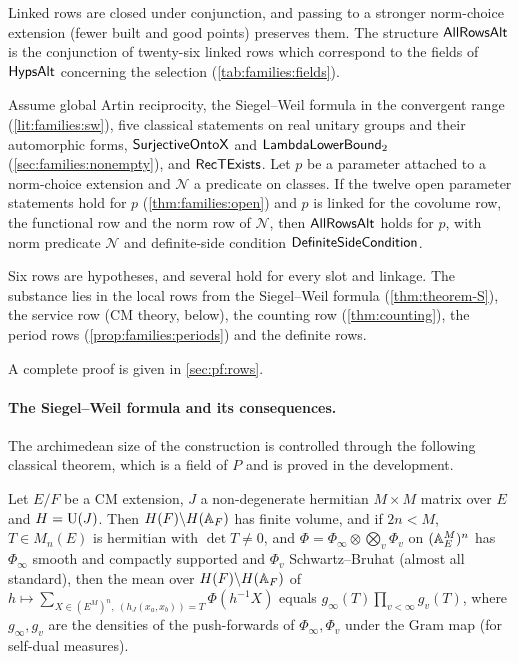 Linked rows are closed under conjunction, and passing to a stronger norm-choice extension (fewer built and good
points) preserves them. The structure $\mathsf{AllRowsAlt}$ is the conjunction of twenty-six linked rows which
correspond to the fields of $\mathsf{HypsAlt}$ concerning the selection (\cref{tab:families:fields}).

\begin{proposition}\Fmark\label{prop:families:allrows}
Assume global Artin reciprocity, the Siegel--Weil formula in the convergent range (\cref{lit:families:sw}), five
classical statements on real unitary groups and their automorphic forms, $\mathsf{SurjectiveOntoX}$ and
$\mathsf{LambdaLowerBound}_2$ (\cref{sec:families:nonempty}), and $\mathsf{RecTExists}$. Let $p$ be a parameter
attached to a norm-choice extension and $\mathcal N$ a predicate on classes. If the twelve open parameter
statements hold for $p$ (\cref{thm:families:open}) and $p$ is linked for the covolume row, the functional row and
the norm row of $\mathcal N$, then $\mathsf{AllRowsAlt}$ holds for $p$, with norm predicate $\mathcal N$ and
definite-side condition $\mathsf{DefiniteSideCondition}$.
\end{proposition}

\begin{proofoutline}
Six rows are hypotheses, and several hold for every slot and linkage. The substance lies in the local rows from
the Siegel--Weil formula (\cref{thm:theorem-S}), the service row (CM theory, below), the counting row
(\cref{thm:counting}), the period rows (\cref{prop:families:periods}) and the definite rows.

A complete proof is given in \cref{sec:pf:rows}.
\end{proofoutline}

\paragraph{The Siegel--Weil formula and its consequences.}
The archimedean size of the construction is controlled through the following classical theorem, which is a
field of $P$ and is proved in the development.

\begin{littheorem}\label{lit:families:sw}
Let $E/F$ be a CM extension, $J$ a non-degenerate hermitian $M\times M$ matrix over $E$ and $H=\operatorname{U}(J)$. Then
$H(F)\backslash H(\mathbb{A}_F)$ has finite volume, and if $2n<M$, $T\in M_n(E)$ is hermitian with $\det T\ne0$, and
$\Phi=\Phi_\infty\otimes\bigotimes_v\Phi_v$ on $(\mathbb{A}_E^M)^n$ has $\Phi_\infty$ smooth and compactly supported and
$\Phi_v$ Schwartz--Bruhat (almost all standard), then the mean over $H(F)\backslash H(\mathbb{A}_F)$ of
$h\mapsto\sum_{X\in(E^M)^n,\ (h_J(x_a,x_b))=T}\Phi(h^{-1}X)$ equals $g_\infty(T)\prod_{v<\infty}g_v(T)$, where
$g_\infty,g_v$ are the densities of the push-forwards of $\Phi_\infty,\Phi_v$ under the Gram map (for self-dual
measures).
\end{littheorem}

